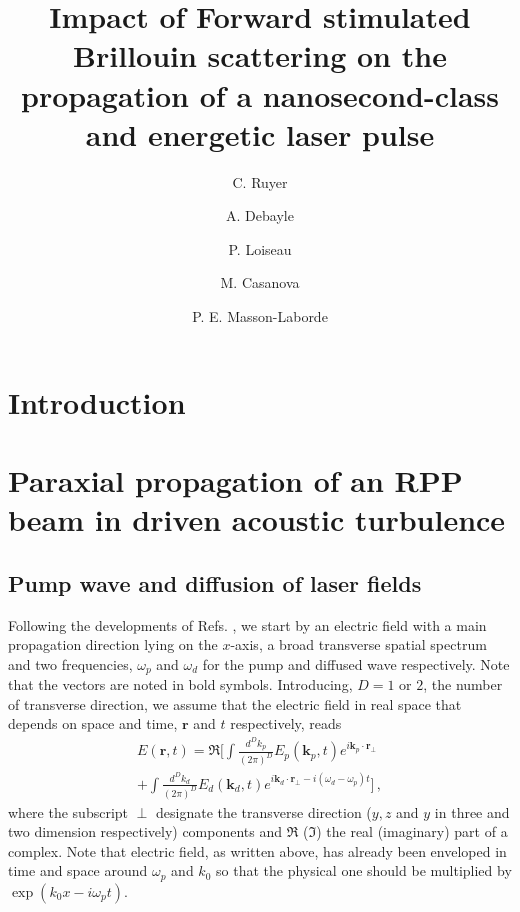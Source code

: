 \documentclass[
 reprint,
 amsmath,amssymb,
 aps,
]{revtex4-1}
\begin{document}
\title{Impact of Forward stimulated Brillouin scattering on the propagation of a nanosecond-class and energetic laser pulse}
\author{C. Ruyer}
\author{A. Debayle}
\author{P. Loiseau}
\author{M. Casanova}
\author{P. E. Masson-Laborde}

\begin{abstract}
\end{abstract}

\maketitle

\section{Introduction}

\section{Paraxial propagation of an RPP beam in  driven acoustic turbulence}
\subsection{Pump wave and diffusion of  laser fields}
Following the developments of Refs. \cite[]{phd-Grech,PRL_Grech_2009}, we start by an electric field with a main propagation direction lying on the $x$-axis, a broad transverse spatial spectrum and two frequencies, $\omega_p$ and $\omega_d$ for the pump and diffused wave  respectively.  Note that the vectors are noted in bold symbols. Introducing, $D=1$ or $2$, the number of transverse direction, we assume that the electric field in real space that depends on space and time, $\mathbf{r}$  and $t$ respectively, reads
\begin{align}
E(\mathbf{r},t)= \Re \Big[ \int \frac{d^Dk_p}{(2\pi)^D} E_p (\mathbf{k}_p,t) e^{i \mathbf{k}_p \cdot \mathbf{r}_\perp} \nonumber \\
+\int \frac{d^Dk_d}{(2\pi)^D} E_d (\mathbf{k}_d,t) e^{i \mathbf{k}_d \cdot \mathbf{r}_\perp -i (\omega_d - \omega_p)t}   \Big] \, ,
\end{align}
where the subscript $\perp$ designate the transverse direction ($y,z$ and $y$ in three and two dimension respectively)  components and $\Re$  ($\Im$) the real (imaginary) part of a complex. Note that electric field, as written above,  has already been enveloped in time and space around $\omega_p$ and $k_0$ so that the physical one should be multiplied  by $\exp(k_0 x-i\omega_p t)$.
\end{document}
